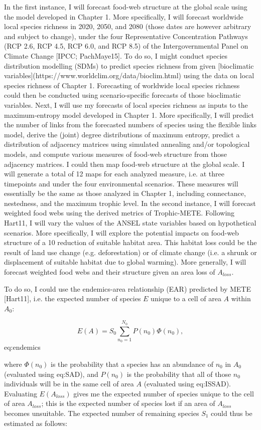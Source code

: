 In the first instance, I will forecast food-web structure at the global scale
using the model developed in Chapter 1. More specifically, I will forecast
worldwide local species richness in 2020, 2050, and 2080 (those dates are
however arbitrary and subject to change), under the four Representative
Concentration Pathways (RCP 2.6, RCP 4.5, RCP 6.0, and RCP 8.5) of the
Intergovernmental Panel on Climate Change [IPCC; PachMaye15]. To do so, I might
conduct species distribution modelling (SDMs) to predict species richness from
given [bioclimatic variables](https://www.worldclim.org/data/bioclim.html) using
the data on local species richness of Chapter 1. Forecasting of worldwide local
species richness could then be conducted using scenario-specific forecasts of
those bioclimatic variables. Next, I will use my forecasts of local species richness as inputs to the
maximum-entropy model developed in Chapter 1. More specifically, I will predict
the number of links from the forecasted numbers of species using the flexible
links model, derive the (joint) degree distributions of maximum entropy, predict
a distribution of adjacency matrices using simulated annealing and/or
topological models, and compute various measures of food-web structure from
those adjacency matrices. I could then map food-web structure at the global
scale. I will generate a total of 12 maps for each analyzed measure, i.e. at
three timepoints and under the four environmental scenarios. These measures will
essentially be the same as those analyzed in Chapter 1, including connectance,
nestedness, and the maximum trophic level. 
In the second instance, I will forecast weighted food webs using the derived
metrics of Trophic-METE. Following Hart11, I will vary the values of the ANSEL
state variables based on hypothetical scenarios. More specifically, I will
explore the potential impacts on food-web structure of a 10%
reduction of suitable habitat area. This habitat loss could be the result of
land use change (e.g. deforestation) or of climate change (i.e. a shrunk or
displacement of suitable habitat due to global warming). More generally, I will
forecast weighted food webs and their structure given an area loss of
$A_{loss}$.

To do so, I could use the endemics-area relationship (EAR) predicted by METE
[Hart11], i.e. the expected number of species $E$ unique to a cell of area $A$
within $A_0$:

$$E(A) = S_0 \sum_{n_0=1}^{N_0}P(n_0)\Phi(n_0),$${eq:endemics}

where $\Phi(n_0)$ is the probability that a species has an abundance of $n_0$ in
$A_0$ (evaluated using eq:SAD), and $P(n_0)$ is the probability that all of
those $n_0$ individuals will be in the same cell of area $A$ (evaluated using
eq:ISSAD). Evaluating $E(A_{loss})$ gives me the expected number of species
unique to the cell of area $A_{loss}$; this is the expected number of species
lost if an area of $A_{loss}$ becomes unsuitable. The expected number of
remaining species $S_1$ could thus be estimated as follows:

